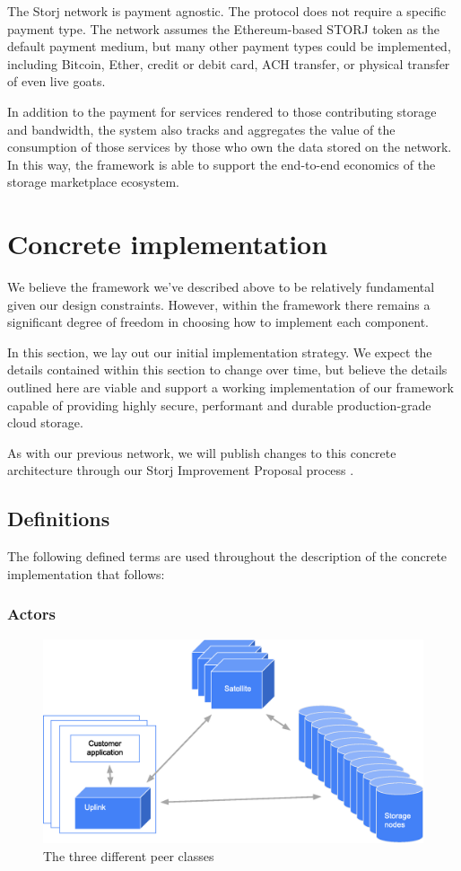 \documentclass[8pt,fleqn,openany]{book}
\begin{document}
The Storj network is payment agnostic.
The protocol does not require a specific payment type.
The network assumes the Ethereum-based STORJ token as the default payment
medium, but many other payment types could be implemented, including Bitcoin,
Ether, credit or debit card, ACH transfer, or physical transfer of even live goats.

In addition to the payment for services rendered to those contributing storage and bandwidth, the system also tracks and aggregates the value of the consumption of those services by those who own the data stored on the network.  In this way, the framework is able to support the end-to-end economics of the storage marketplace ecosystem.

\chapter{Concrete implementation}\label{chap:concrete}

We believe the framework we've described above to be relatively fundamental
given our design constraints. However, within the framework there remains a
significant degree of freedom in choosing how to implement each component.

In this section, we lay out our initial implementation strategy. We expect
the details contained within this section to change over time, but believe the
details outlined here are viable and support a working implementation of our
framework capable of providing highly secure, performant and durable production-grade cloud storage.

As with our previous network, we will publish changes to this concrete
architecture through our Storj Improvement Proposal process \cite{sips}.

\section{Definitions}

The following defined terms are used throughout the description of the concrete implementation that follows:

\subsection{Actors}

\begin{figure}
\centering
\includegraphics[width=\textwidth]{diagram-drafts/peers.eps}
\caption{The three different peer classes}
\end{figure}
\end{document}
